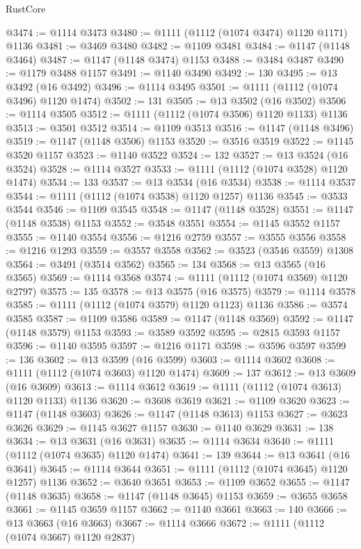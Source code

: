 \begin{lexlean}{RustCore}
\begin{coremodule}
@3474 := @1114 @3473
@3480 := @1111 (@1112 (@1074 @3474) @1120 @1171) @1136
@3481 := @3469 @3480
@3482 := @1109 @3481
@3484 := @1147 (@1148 @3464)
@3487 := @1147 (@1148 @3474) @1153
@3488 := @3484 @3487
@3490 := @1179 @3488 @1157
@3491 := @1140 @3490
@3492 := 130
@3495 := @13 @3492 (@16 @3492)
@3496 := @1114 @3495
@3501 := @1111 (@1112 (@1074 @3496) @1120 @1474)
@3502 := 131
@3505 := @13 @3502 (@16 @3502)
@3506 := @1114 @3505
@3512 := @1111 (@1112 (@1074 @3506) @1120 @1133) @1136
@3513 := @3501 @3512
@3514 := @1109 @3513
@3516 := @1147 (@1148 @3496)
@3519 := @1147 (@1148 @3506) @1153
@3520 := @3516 @3519
@3522 := @1145 @3520 @1157
@3523 := @1140 @3522
@3524 := 132
@3527 := @13 @3524 (@16 @3524)
@3528 := @1114 @3527
@3533 := @1111 (@1112 (@1074 @3528) @1120 @1474)
@3534 := 133
@3537 := @13 @3534 (@16 @3534)
@3538 := @1114 @3537
@3544 := @1111 (@1112 (@1074 @3538) @1120 @1257) @1136
@3545 := @3533 @3544
@3546 := @1109 @3545
@3548 := @1147 (@1148 @3528)
@3551 := @1147 (@1148 @3538) @1153
@3552 := @3548 @3551
@3554 := @1145 @3552 @1157
@3555 := @1140 @3554
@3556 := @1216 @2759
@3557 := @3555 @3556
@3558 := @1216 @1293
@3559 := @3557 @3558
@3562 := @3523 (@3546 @3559) @1308
@3564 := @3491 (@3514 @3562)
@3565 := 134
@3568 := @13 @3565 (@16 @3565)
@3569 := @1114 @3568
@3574 := @1111 (@1112 (@1074 @3569) @1120 @2797)
@3575 := 135
@3578 := @13 @3575 (@16 @3575)
@3579 := @1114 @3578
@3585 := @1111 (@1112 (@1074 @3579) @1120 @1123) @1136
@3586 := @3574 @3585
@3587 := @1109 @3586
@3589 := @1147 (@1148 @3569)
@3592 := @1147 (@1148 @3579) @1153
@3593 := @3589 @3592
@3595 := @2815 @3593 @1157
@3596 := @1140 @3595
@3597 := @1216 @1171
@3598 := @3596 @3597
@3599 := 136
@3602 := @13 @3599 (@16 @3599)
@3603 := @1114 @3602
@3608 := @1111 (@1112 (@1074 @3603) @1120 @1474)
@3609 := 137
@3612 := @13 @3609 (@16 @3609)
@3613 := @1114 @3612
@3619 := @1111 (@1112 (@1074 @3613) @1120 @1133) @1136
@3620 := @3608 @3619
@3621 := @1109 @3620
@3623 := @1147 (@1148 @3603)
@3626 := @1147 (@1148 @3613) @1153
@3627 := @3623 @3626
@3629 := @1145 @3627 @1157
@3630 := @1140 @3629
@3631 := 138
@3634 := @13 @3631 (@16 @3631)
@3635 := @1114 @3634
@3640 := @1111 (@1112 (@1074 @3635) @1120 @1474)
@3641 := 139
@3644 := @13 @3641 (@16 @3641)
@3645 := @1114 @3644
@3651 := @1111 (@1112 (@1074 @3645) @1120 @1257) @1136
@3652 := @3640 @3651
@3653 := @1109 @3652
@3655 := @1147 (@1148 @3635)
@3658 := @1147 (@1148 @3645) @1153
@3659 := @3655 @3658
@3661 := @1145 @3659 @1157
@3662 := @1140 @3661
@3663 := 140
@3666 := @13 @3663 (@16 @3663)
@3667 := @1114 @3666
@3672 := @1111 (@1112 (@1074 @3667) @1120 @2837)

\end{coremodule}
\end{lexlean}
